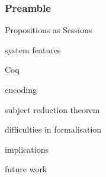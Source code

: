 \documentclass{beamer}
\begin{document}
\begin{comment}
whats the problem
what have others done
why are we doing it
what did we do
what have we learned
\end{comment}
\begin{frame}
\frametitle{Preamble}
\item Propositions as Sessions
\item system features
\item Coq
\item encoding
\item subject reduction theorem
\item difficulties in formalisation
\item implications
\item future work
\end{frame}

\printbibliography
\end{document}
